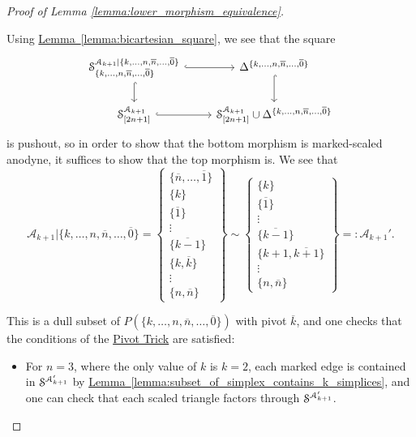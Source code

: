 \documentclass[main.tex]{subfiles}
\begin{document}
\begin{proof}[Proof of Lemma \ref{lemma:lower_morphism_equivalence}]
\begin{enumerate}
\begin{itemize}
          Using \hyperref[lemma:bicartesian_square]{Lemma~\ref*{lemma:bicartesian_square}}, we see that the square
          \begin{equation*}
            \begin{tikzcd}
              \S^{\mathcal{A}_{k+1}|\{k, \ldots, n, \overline{n}, \ldots, \overline{0}\}}_{\{k, \ldots, n, \overline{n}, \ldots, \overline{0}\}}
              \arrow[r, hook]
              \arrow[d, hook]
              & \Delta^{\{k, \ldots, n, \overline{n}, \ldots, \overline{0}\}}
              \arrow[d, hook]
              \\
              \S^{\mathcal{A}_{k+1}}_{[2n+1]}
              \arrow[r, hook]
              & \S^{\mathcal{A}_{k+1}}_{[2n+1]} \cup \Delta^{\{k, \ldots, n, \overline{n}, \ldots, \overline{0}\}}
            \end{tikzcd}
          \end{equation*}
          is pushout, so in order to show that the bottom morphism is marked-scaled anodyne, it suffices to show that the top morphism is. We see that
          \begin{equation*}
            \mathcal{A}_{k+1}|\{k, \ldots, n, \overline{n}, \ldots, \overline{0}\} =
            \left\{ \substack{ \{\overline{n}, \ldots, \overline{1}\} \\ \{k\} \\ \{\overline{1}\} \\ \vdots \\ \{\overline{k-1}\} \\ \{k, \overline{k}\} \\ \vdots \\ \{n, \overline{n}\} } \right\}
            \sim \left\{ \substack{ \{k\} \\ \{\overline{1}\} \\ \vdots \\ \{\overline{k-1}\} \\ \{k+1, \overline{k+1}\} \\ \vdots \\ \{n, \overline{n}\} } \right\} =: \mathcal{A}_{k+1}'.
          \end{equation*}

          This is a dull subset of $P(\{k, \ldots, n, \overline{n}, \ldots, \overline{0}\})$ with pivot $\overline{k}$, and one checks that the conditions of the \hyperref[lemma:pivot_trick]{Pivot Trick} are satisfied:
          \begin{itemize}
            \item For $n = 3$, where the only value of $k$ is $k = 2$, each marked edge is contained in $\S^{\mathcal{A}_{k+1}'}$ by \hyperref[lemma:subset_of_simplex_contains_k_simplices]{Lemma~\ref*{lemma:subset_of_simplex_contains_k_simplices}}, and one can check that each scaled triangle factors through $\S^{\mathcal{A}_{k+1}'}$.


\end{itemize}
\end{itemize}
\end{enumerate}
\end{proof}
\end{document}
